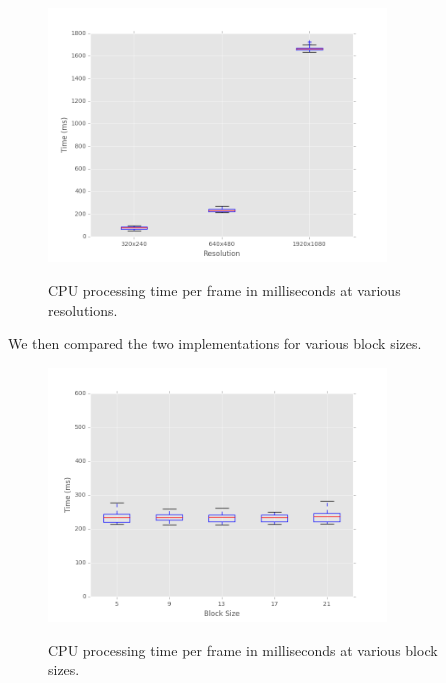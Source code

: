 \documentclass[12pt,letterpaper]{article}
\begin{document}
\begin{figure}[H]
  \centering
    \includegraphics[width=0.8\textwidth]{cpu_resolution.png}
  \label{fig:cpures}
  \caption{CPU processing time per frame in milliseconds at various resolutions.}
\end{figure}

We then compared the two implementations for various block sizes.

\begin{figure}[H]
  \centering
    \includegraphics[width=0.8\textwidth]{cpu_blocksize.png}
  \label{fig:cpublock}
  \caption{CPU processing time per frame in milliseconds at various block sizes.}
\end{figure}
\end{document}
